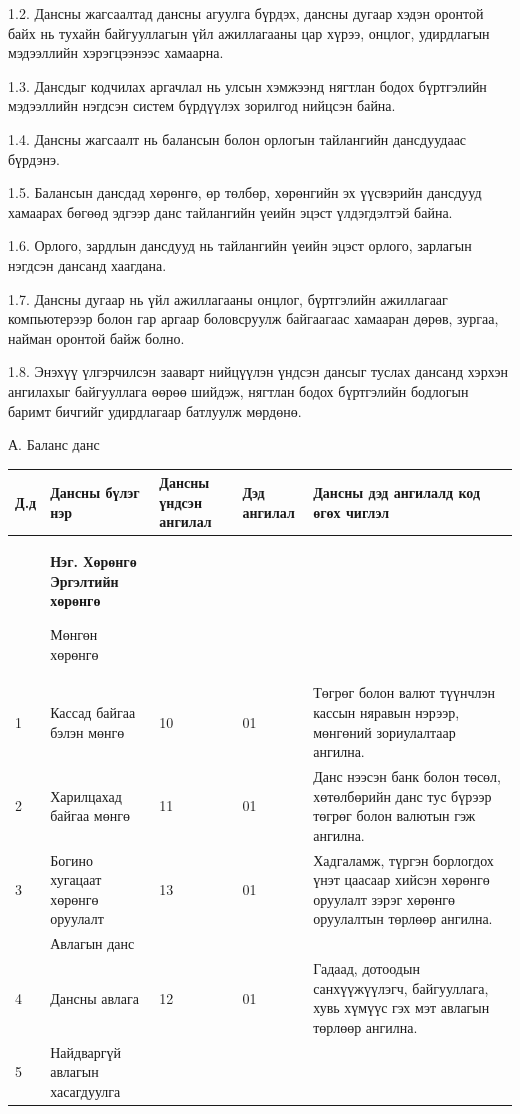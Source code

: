 {{{{{1.2. Дансны жагсаалтад дансны агуулга бүрдэх, дансны дугаар хэдэн оронтой байх нь тухайн байгууллагын үйл ажиллагааны цар хүрээ, онцлог, удирдлагын мэдээллийн хэрэгцээнээс хамаарна.

1.3. Дансдыг кодчилах аргачлал нь улсын хэмжээнд нягтлан бодох бүртгэлийн мэдээллийн нэгдсэн систем бүрдүүлэх зорилгод нийцсэн байна.

1.4. Дансны жагсаалт нь балансын болон орлогын тайлангийн дансдуудаас бүрдэнэ.

1.5. Балансын дансдад хөрөнгө, өр төлбөр, хөрөнгийн эх үүсвэрийн дансдууд хамаарах бөгөөд эдгээр  данс тайлангийн үеийн эцэст үлдэгдэлтэй байна.

1.6. Орлого, зардлын дансдууд нь тайлангийн үеийн эцэст орлого, зарлагын нэгдсэн дансанд хаагдана.

1.7. Дансны дугаар нь үйл ажиллагааны онцлог, бүртгэлийн ажиллагааг компьютерээр болон гар аргаар боловсруулж байгаагаас хамааран дөрөв, зургаа, найман оронтой байж болно.

1.8. Энэхүү үлгэрчилсэн зааварт нийцүүлэн үндсэн дансыг туслах дансанд хэрхэн ангилахыг байгууллага өөрөө шийдэж, нягтлан бодох бүртгэлийн бодлогын баримт бичгийг удирдлагаар батлуулж мөрдөнө.
\begin{center}
	А. Баланс данс
\end{center}   
\begin{tabular}{ |p{0.5cm}||p{5cm}|p{1cm}|p{1cm}|p{4.8cm} | }
	\hline
	
	\hline
	Д.д& Дансны бүлэг нэр &Дансны үндсэн ангилал&Дэд ангилал& Дансны дэд ангилалд код өгөх чиглэл\\
	\hline
	&            \textbf{Нэг. Хөрөнгө Эргэлтийн хөрөнгө}
	
	
	Мөнгөн хөрөнгө
	& &  & \\
	1   & Кассад байгаа бэлэн мөнгө    &10&   01 &Төгрөг болон валют түүнчлэн кассын няравын нэрээр, мөнгөний зориулалтаар ангилна.\\
	2&   Харилцахад байгаа мөнгө 
	
	
	& 11   &01 & Данс нээсэн банк болон төсөл, хөтөлбөрийн данс тус бүрээр төгрөг болон валютын гэж ангилна.\\
	3 &Богино хугацаат хөрөнгө оруулалт & 13&  01 &Хадгаламж, түргэн борлогдох үнэт цаасаар хийсэн хөрөнгө оруулалт зэрэг хөрөнгө оруулалтын төрлөөр ангилна.\\
	
	
	\hline
	
	\hline
	
	&           Авлагын данс
	& &  & \\
	4  &Дансны авлага   &12&   01 &Гадаад, дотоодын санхүүжүүлэгч, байгууллага, хувь хүмүүс гэх мэт авлагын төрлөөр ангилна.\\
	5&  Найдваргүй авлагын хасагдуулга 
	

\end{tabular}}}}}}
